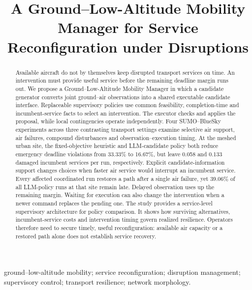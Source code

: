 \documentclass[]{interact}
\theoremstyle{plain}
\theoremstyle{definition}
\theoremstyle{remark}
\begin{document}
\title{A Ground--Low-Altitude Mobility Manager for Service Reconfiguration under Disruptions}

\author{
}

\maketitle

\begin{abstract}
Available aircraft do not by themselves keep disrupted transport services on time. An intervention must provide useful service before the remaining deadline margin runs out. We propose a Ground--Low-Altitude Mobility Manager in which a candidate generator converts joint ground--air observations into a shared executable candidate interface. Replaceable supervisory policies use common feasibility, completion-time and incumbent-service facts to select an intervention. The executor checks and applies the proposal, while local contingencies operate independently. Four SUMO--BlueSky experiments across three contrasting transport settings examine selective air support, air failures, compound disturbances and observation--execution timing. At the meshed urban site, the fixed-objective heuristic and LLM-candidate policy both reduce emergency deadline violations from 33.33\% to 16.67\%, but leave 0.058 and 0.133 damaged incumbent services per run, respectively. Explicit candidate-information support changes choices when faster air service would interrupt an incumbent service. Every affected coordinated run restores a path after a single air failure, yet 39.06\% of all LLM-policy runs at that site remain late. Delayed observation uses up the remaining margin. Waiting for execution can also change the intervention when a newer command replaces the pending one. The study provides a service-level supervisory architecture for policy comparison. It shows how surviving alternatives, incumbent-service costs and intervention timing govern realized resilience. Operators therefore need to secure timely, useful reconfiguration: available air capacity or a restored path alone does not establish service recovery.
\end{abstract}

\begin{keywords}
ground--low-altitude mobility; service reconfiguration; disruption management; supervisory control; transport resilience; network morphology.
\end{keywords}
\end{document}
